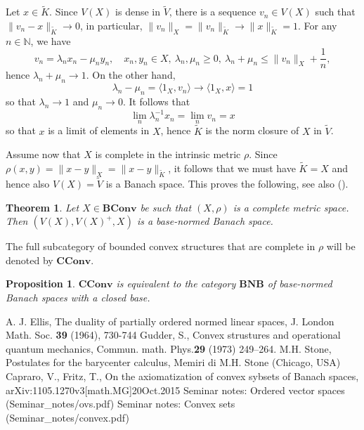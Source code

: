 \documentclass[12pt,letterpaper]{article}
\newtheorem{theorem}[lemma]{Theorem}
\newtheorem{proposition}[lemma]{Proposition}
\newcommand{\ct}[1]{\mathbf{#1}}
\newcommand{\<}{\langle}
\def\>{\rangle}
\begin{document}
Let $x\in \tilde K$. Since $V(X)$ is dense in $\tilde V$, there is a sequence $v_n\in V(X)$ such that $\|v_n-x\|_{\tilde K}\to 0$, 
in particular, $\|v_n\|_X=\|v_n\|_{\tilde K}\to \|x\|_{\tilde K}=1$. For any $n\in \mathbb N$, we have
\[
v_n=\lambda_n x_n-\mu_n y_n,\quad x_n,y_n\in X,\ \lambda_n,\mu_n\ge 0,\ \lambda_n+\mu_n\le \|v_n\|_X+\frac1n,
\]
hence $\lambda_n+\mu_n\to 1$. On the other hand, 
\[
\lambda_n-\mu_n=\<1_X,v_n\>\to \<1_X,x\>=1
\]
so that $\lambda_n\to 1$ and $\mu_n\to 0$. It follows that
\[
\lim_n \lambda_n^{-1}x_n=\lim_n v_n =x
\]
so that $x$ is a limit of elements in $X$, hence  $\tilde K$ is the norm closure of $X$ in $\tilde V$. 


Assume now that $X$ is complete in the intrinsic metric $\rho$. Since $\rho(x,y)=\|x-y\|_X=\|x-y\|_{\tilde K}$, it follows that we must have $\tilde K=X$ and hence also $V(X)=\tilde V$ is a Banach space.
This proves the following, see also \cite{G} (\cite[Thm. 2.7]{convex}). 

\begin{theorem}
Let $X\in \ct{BConv}$ be such that $(X,\rho)$ is a complete metric space. Then $(V(X), V(X)^+, X)$ is a base-normed Banach space.
\end{theorem}

The full subcategory of bounded convex structures that are complete in $\rho$ will be denoted by $\ct{CConv}$. 

\begin{proposition} $\ct{CConv}$ is equivalent to the category $\ct{BNB}$ of base-normed Banach spaces with a closed base.

\end{proposition}




\begin{thebibliography}{WWW}
 A. J. Ellis, The duality of partially ordered normed linear spaces, J. London Math. Soc. \textbf{39} (1964), 730-744
 Gudder, S., Convex strustures and operational quantum mechanics, Commun. math. Phys.{\bf 29} (1973) 249--264.
 M.H. Stone, Postulates for the barycenter calculus, Memiri di M.H. Stone (Chicago, USA)
 Capraro, V., Fritz, T., On the axiomatization of convex sybsets of Banach spaces, arXiv:1105.1270v3[math.MG]20Oct.2015
 Seminar notes: Ordered vector spaces (Seminar\_notes/ovs.pdf)
 Seminar notes: Convex sets (Seminar\_notes/convex.pdf)

\end{thebibliography}
\end{document}
